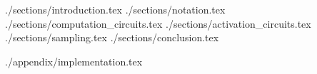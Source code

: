 \documentclass[a4paper,11pt,english]{article}
\begin{document}
    \title{\mytitle{}}
    \author{Alex Goessmann}
    \author{Martin Eigel}

    \maketitle

    \begin{abstract}
        
    \end{abstract}

    {./sections/introduction.tex}
    {./sections/notation.tex}
    {./sections/computation_circuits.tex}
    {./sections/activation_circuits.tex}
    {./sections/sampling.tex}
    {./sections/conclusion.tex}



    \vskip 0.2in
    
    

    \appendix

    {./appendix/implementation.tex}
\end{document}
